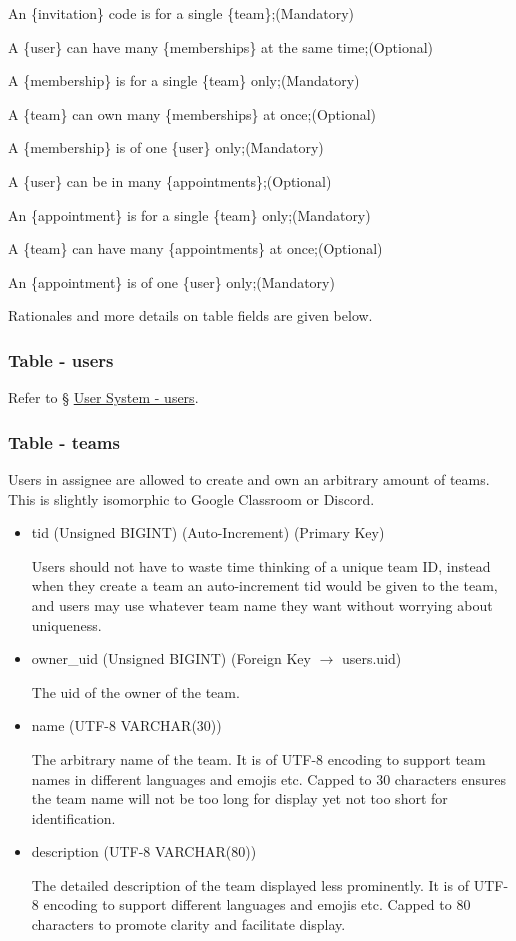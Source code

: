 \documentclass[12pt]{report}
\newcommand{\n}{\par}
\newcommand{\br}{\n\vspace{1 em}\n}
\begin{document}
An \{invitation\} code is for a single \{team\};\null\hfill (Mandatory)
\br
A \{user\} can have many \{memberships\} at the same time;\null\hfill (Optional)\n
A \{membership\} is for a single \{team\} only;\null\hfill (Mandatory)
\br
A \{team\} can own many \{memberships\} at once;\null\hfill (Optional)\n
A \{membership\} is of one \{user\} only;\null\hfill (Mandatory)
\br
A \{user\} can be in many \{appointments\};\null\hfill (Optional)\n
An \{appointment\} is for a single \{team\} only;\null\hfill (Mandatory)
\br
A \{team\} can have many \{appointments\} at once;\null\hfill (Optional)\n
An \{appointment\} is of one \{user\} only;\null\hfill (Mandatory)
\br
Rationales and more details on table fields are given below.

\subsubsection{Table - users} \label{data-layer.design.team-system.users}
Refer to \S{} \hyperref[data-layer.design.user-system.users]{User System - users}.

\subsubsection{Table - teams} \label{data-layer.design.team-system.teams}
Users in assignee are allowed to create and own an arbitrary amount of teams.
This is slightly isomorphic to Google Classroom or Discord.
\begin{itemize}
	\item tid (Unsigned BIGINT) (Auto-Increment) (Primary Key)\n
	      Users should not have to waste time thinking of a unique team ID,
	      instead when they create a team an auto-increment tid would be given to the team,
	      and users may use whatever team name they want without worrying about uniqueness.
	\item owner\_uid (Unsigned BIGINT) (Foreign Key $\rightarrow$ users.uid)\n
	      The uid of the owner of the team.
	\item name (UTF-8 VARCHAR(30))\n
	      The arbitrary name of the team.
	      It is of UTF-8 encoding to support team names in different languages and emojis etc.
	      Capped to 30 characters ensures the team name will not be too long for display yet not too short for identification.
	\item description (UTF-8 VARCHAR(80))\n
	      The detailed description of the team displayed less prominently.
	      It is of UTF-8 encoding to support different languages and emojis etc.
	      Capped to 80 characters to promote clarity and facilitate display.
\end{itemize}
\end{document}
